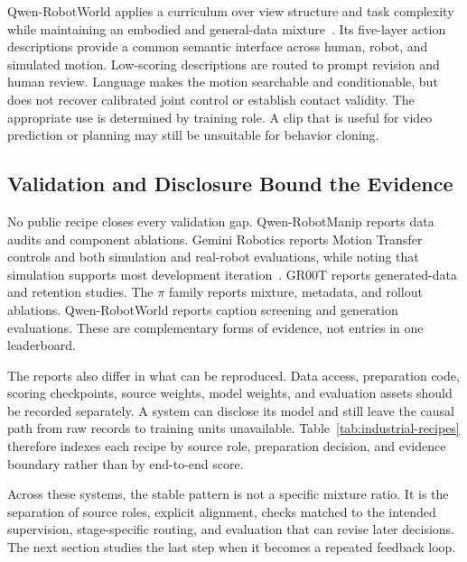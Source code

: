Qwen-RobotWorld applies a curriculum over view structure and task complexity while maintaining an embodied and general-data mixture~\cite{zhang2026qwen_2606_17030}. Its five-layer action descriptions provide a common semantic interface across human, robot, and simulated motion. Low-scoring descriptions are routed to prompt revision and human review. Language makes the motion searchable and conditionable, but does not recover calibrated joint control or establish contact validity. The appropriate use is determined by training role. A clip that is useful for video prediction or planning may still be unsuitable for behavior cloning.

\subsection{Validation and Disclosure Bound the Evidence}

No public recipe closes every validation gap. Qwen-RobotManip reports data audits and component ablations. Gemini Robotics reports Motion Transfer controls and both simulation and real-robot evaluations, while noting that simulation supports most development iteration~\cite{team2025gemini_2510_03342}. GR00T reports generated-data and retention studies. The $\pi$ family reports mixture, metadata, and rollout ablations. Qwen-RobotWorld reports caption screening and generation evaluations. These are complementary forms of evidence, not entries in one leaderboard.

The reports also differ in what can be reproduced. Data access, preparation code, scoring checkpoints, source weights, model weights, and evaluation assets should be recorded separately. A system can disclose its model and still leave the causal path from raw records to training units unavailable. Table~\ref{tab:industrial-recipes} therefore indexes each recipe by source role, preparation decision, and evidence boundary rather than by end-to-end score.



Across these systems, the stable pattern is not a specific mixture ratio. It is the separation of source roles, explicit alignment, checks matched to the intended supervision, stage-specific routing, and evaluation that can revise later decisions. The next section studies the last step when it becomes a repeated feedback loop.
